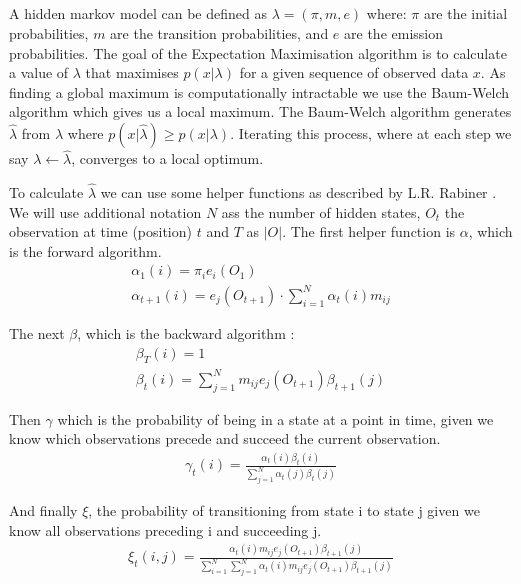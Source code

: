 \subsection{}

\subsection{}
A hidden markov model can be defined as $\lambda = (\pi, m, e)$ where: $\pi$ are the initial probabilities, $m$ are the transition probabilities, and $e$ are the emission probabilities.
The goal of the Expectation Maximisation algorithm is to calculate a value of $\lambda$ that maximises $p(x|\lambda)$ for a given sequence of observed data $x$. As finding a global maximum is computationally intractable we use the Baum-Welch algorithm which gives us a local maximum. The Baum-Welch algorithm generates $\hat{\lambda}$ from $\lambda$ where $p(x|\hat{\lambda}) \geq p(x|\lambda)$. Iterating this process, where at each step we say $\lambda \gets \hat{\lambda}$, converges to a local optimum.

To calculate $\hat{\lambda}$ we can use some helper functions as described by L.R. Rabiner \cite{em}. We will use additional notation $N$ ass the number of hidden states, $O_t$ the observation at time (position) $t$ and $T$ as $|O|$.  The first helper function is $\alpha$, which is the forward algorithm.
\begin{gather*}
    \alpha_1(i) = \pi_i e_i(O_1)\\
    \alpha_{t+1}(i) = e_j(O_{t+1}) \cdot \sum_{i=1}^N\alpha_t(i)m_{ij}
\end{gather*}

The next $\beta$, which is the backward algorithm :
\begin{gather*}
    \beta_T(i)=1\\
    \beta_t(i)=\sum_{j=1}^N m_{ij} e_j(O_{t+1}) \beta_{t+1}(j)
\end{gather*}

Then $\gamma$ which is the probability of being in a state at a point in time, given we know which observations precede and succeed the current observation.
\begin{gather*}
    \gamma_t(i) = \frac{\alpha_t(i) \beta_t(i)}{\sum_{j=1}^N \alpha_t(j) \beta_t(j)}
\end{gather*}

And finally $\xi$, the probability of transitioning from state i to state j given we know all observations preceding i and succeeding j.
\begin{gather*}
    \xi_t(i, j) = \frac{\alpha_t(i) m_{ij} e_j(O_{t+1}) \beta_{t+1}(j)}{\sum_{i=1}^N \sum_{j=1}^N \alpha_t(i) m_{ij} e_j(O_{t+1}) \beta_{t+1}(j)}
\end{gather*}

